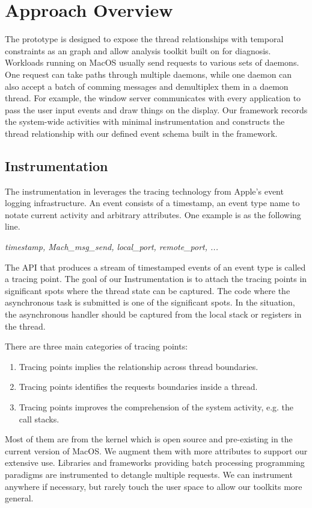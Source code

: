 \section{Approach Overview}

The \xxx prototype is designed to expose the thread relationships with temporal constraints as an graph and allow analysis toolkit built on for diagnosis.
Workloads running on MacOS usually send requests to various sets of daemons.
One request can take paths through multiple daemons, while one daemon can also accept a batch of comming messages and demultiplex them in a daemon thread.
For example, the window server communicates with every application to pass the user input events and draw things on the display.
Our framework records the system-wide activities with minimal instrumentation and constructs the thread relationship with our defined event schema built in the framework.

\subsection{Instrumentation}
The instrumentation in \xxx leverages the tracing technology from Apple's event logging infrastructure.
An event consists of a timestamp, an event type name to notate current activity and arbitrary attributes.
One example is as the following line.

\textit{timestamp, Mach\_msg\_send, local\_port, remote\_port, ...}

The API that produces a stream of timestamped events of an event type is called a tracing point.
The goal of our Instrumentation is to attach the tracing points in significant spots where the thread state can be captured.
The code where the asynchronous task is submitted is one of the significant spots.
In the situation, the asynchronous handler should be captured from the local stack or registers in the thread.

There are three main categories of tracing points:
\begin {enumerate}
	\item Tracing points implies the relationship across thread boundaries.
	\item Tracing points identifies the requests boundaries inside a thread.
	\item Tracing points improves the comprehension of the system activity, e.g. the call stacks.
\end{enumerate}

Most of them are from the kernel which is open source and pre-existing in the current version of MacOS.
We augment them with more attributes to support our extensive use.
Libraries and frameworks providing batch processing programming paradigms are instrumented to detangle multiple requests.
We can instrument anywhere if necessary, but rarely touch the user space to allow our toolkits more general.

